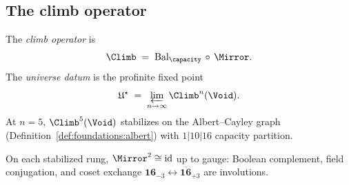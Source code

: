 \subsection{The climb operator}
\label{sec:void-mirror:climb-op}

\begin{definition}\label{def:void-mirror:Climb}
The \emph{climb operator} is
\begin{equation}\label{eq:void-mirror:Climb}
  \Climb\;=\;\mathrm{Bal}_\capacity\,\circ\,\Mirror.
\end{equation}
The \emph{universe datum} is the profinite fixed point
\begin{equation}\label{eq:void-mirror:universe}
  \mathfrak{U}^\star\;=\;\varprojlim_{n\to\infty}\Climb^n(\Void).
\end{equation}
At $n=5$, $\Climb^5(\Void)$ stabilizes on the Albert--Cayley graph
(Definition~\ref{def:foundations:albert}) with $1|10|16$ capacity partition.
\end{definition}

\begin{proposition}\label{prop:void-mirror:involution}
On each stabilized rung, $\Mirror^2\cong\mathrm{id}$ up to gauge:
Boolean complement, field conjugation, and coset exchange
$\mathbf{16}_{-3}\leftrightarrow\overline{\mathbf{16}}_{+3}$ are involutions.
\end{proposition}